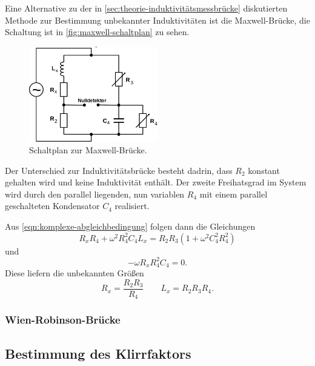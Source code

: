 Eine Alternative zu der in \autoref{sec:theorie-induktivitätsmessbrücke} diskutierten Methode zur
Bestimmung unbekannter Induktivitäten ist die Maxwell-Brücke, die Schaltung ist in 
\autoref{fig:maxwell-schaltplan} zu sehen.
\begin{figure}[H]
	\centering
	\includegraphics[width=0.5\textwidth]{bilder/maxwellbruecke.png}
	\caption{Schaltplan zur Maxwell-Brücke.}
	\label{fig:maxwell-schaltplan}
\end{figure}

Der Unterschied zur Induktivitätsbrücke besteht dadrin, dass $R_2$ konstant gehalten wird und keine 
Induktivität enthält. Der zweite Freihatsgrad im System wird durch den parallel liegenden, nun
variablen $R_4$ mit einem parallel geschalteten Kondensator $C_4$ realisiert.

Aus \autoref{eqn:komplexe-abgleichbedingung} folgen dann die Gleichungen
\begin{equation}
	R_x R_4 + \omega^2 R_4^2 C_4 L_x = R_2 R_3 \left(1 + \omega^2 C_4^2 R_4^2 \right)
	\label{eqn:maxwell-gleichung1}
\end{equation}
und
\begin{equation}
	-\omega R_x R_4^2 C_4 = 0.
	\label{eqn:maxwell-gleichung2}
\end{equation}
Diese liefern die unbekannten Größen
\begin{equation}
	R_x = \frac{R_2 R_3}{R_4}
	\qquad
	L_x = R_2 R_3 R_4.
	\label{eqn:kenngroessen-maxwell}
\end{equation}

\subsubsection{Wien-Robinson-Brücke}
\label{sec:theorie-wien-robinson-bruecke}

\subsection{Bestimmung des Klirrfaktors}
\label{sec:klirrfaktor}

\cite{sample}
